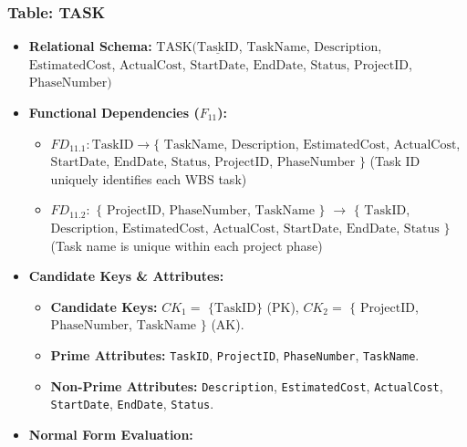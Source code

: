 \documentclass[a4paper,12pt]{report}
\begin{document}
\subsubsection{Table: TASK}\label{table-task}

\begin{itemize}
\item
  \textbf{Relational Schema:} \(\text{TASK}(\underline{\text{TaskID}}\), \(\text{TaskName}\), \(\text{Description}\), \(\text{EstimatedCost}\), \(\text{ActualCost}\), \(\text{StartDate}\), \(\text{EndDate}\), \(\text{Status}\), \(\text{ProjectID}\), \(\text{PhaseNumber})\)
\item
  \textbf{Functional Dependencies (\(F_{11}\)):}

  \begin{itemize}
  \item
    \(FD_{11.1}: \text{TaskID} \rightarrow \{\) \(\text{TaskName}\), \(\text{Description}\), \(\text{EstimatedCost}\), \(\text{ActualCost}\), \(\text{StartDate}\), \(\text{EndDate}\), \(\text{Status}\), \(\text{ProjectID}\), \(\text{PhaseNumber}\) \(\}\) (Task ID uniquely identifies each WBS task)
  \item
    \(FD_{11.2}:\) \(\{\) \(\text{ProjectID}\), \(\text{PhaseNumber}\), \(\text{TaskName}\) \(\}\) \(\rightarrow\) \(\{\) \(\text{TaskID}\), \(\text{Description}\), \(\text{EstimatedCost}\), \(\text{ActualCost}\), \(\text{StartDate}\), \(\text{EndDate}\), \(\text{Status}\) \(\}\) (Task name is unique within each project phase)
  \end{itemize}
\item
  \textbf{Candidate Keys \& Attributes:}

  \begin{itemize}
  \item
    \textbf{Candidate Keys:} \(CK_{1} =\) \(\{\text{TaskID}\}\) (PK), \(CK_{2} =\) \(\{\) \(\text{ProjectID}\), \(\text{PhaseNumber}\), \(\text{TaskName}\) \(\}\) (AK).
  \item
    \textbf{Prime Attributes:} \texttt{TaskID}, \texttt{ProjectID}, \texttt{PhaseNumber}, \texttt{TaskName}.
  \item
    \textbf{Non-Prime Attributes:} \texttt{Description}, \texttt{EstimatedCost}, \texttt{ActualCost}, \texttt{StartDate}, \texttt{EndDate}, \texttt{Status}.
  \end{itemize}
\item
  \textbf{Normal Form Evaluation:}


\end{itemize}
\end{document}

